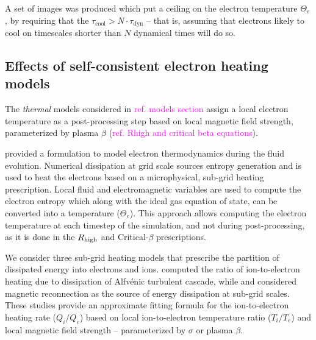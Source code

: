 A set of images was produced which put a ceiling on the electron temperature $\Theta_e$, by requiring that the $\tau_\mathrm{cool} > N \cdot \tau_\mathrm{dyn}$ -- that is, assuming that electrons likely to cool on timescales shorter than $N$ dynamical times will do so.





\subsection{Effects of self-consistent electron heating models}

The \textit{thermal} models considered in \textcolor{magenta}{ref. models section} assign a local electron temperature as a post-processing step based on local magnetic field strength, parameterized by plasma $\beta$ (\textcolor{magenta}{ref. Rhigh and critical beta equations}).

\citealt{10.1093/mnras/stv2084} provided a formulation to model electron thermodynamics during the fluid evolution. Numerical dissipation at grid scale sources entropy generation and is used to heat the electrons based on a microphysical, sub-grid heating prescription. Local fluid and electromagnetic variables are used to compute the electron entropy which along with the ideal gas equation of state, can be converted into a temperature ($\Theta_{e}$). This approach allows computing the electron temperature at each timestep of the simulation, and not during post-processing, as it is done in the $R_\mathrm{high}$ and Critical-$\beta$ prescriptions.

We consider three sub-grid heating models that prescribe the partition of dissipated energy into electrons and ions. \citealt{2010MNRAS.409L.104H} computed the ratio of ion-to-electron heating due to dissipation of Alfv\'enic turbulent cascade, while \citealt{10.1093/mnras/stx2530} and \citealt{Rowan_2017} considered magnetic reconnection as the source of energy dissipation at sub-grid scales. These studies provide an approximate fitting formula for the ion-to-electron heating rate ($Q_{i}/Q_{e}$) based on local ion-to-electron temperature ratio ($T_{i}/T_{e}$) and local magnetic field strength -- parameterized by $\sigma$ or plasma $\beta$.

